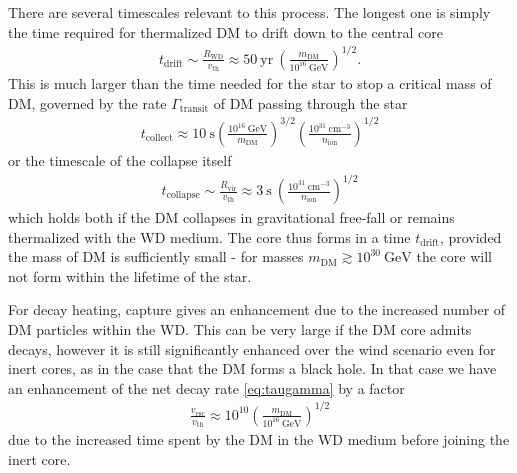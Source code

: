 \documentclass[preprintnumbers,amsmath,amssymb,prd, superscriptaddress,twocolumn]{revtex4}
\newcommand{\GeV}{\text{GeV}}
\newcommand{\cm}{\text{cm}}
\def\r{\right)}
\def\l{\left(}
\begin{document}
There are several timescales relevant to this process.
The longest one is simply the time required for thermalized DM to drift down to the central core
\begin{align}
\label{eq:tdrift}
  t_\text{drift} \sim \frac{R_\text{WD}}{v_\text{th}}
  \approx 50 ~\text{yr} ~ \l \frac{m_\text{DM}}{10^{16} ~\GeV} \r^{1/2}.
\end{align}
This is much larger than the time needed for the star to stop a critical mass of DM, governed by the rate $\Gamma_\text{transit}$ of DM passing through the star
\begin{align}
\label{eq:tcol}
  t_\text{collect}
  \approx 10 ~\text{s} \l \frac{10^{16} ~\GeV}{m_\text{DM}} \r^{3/2}
  \l \frac{10^{31} ~\cm^{-3}}{n_\text{ion}}\r^{1/2}
\end{align}
or the timescale of the collapse itself
\begin{align}
  t_\text{collapse} \sim \frac{R_\text{vir}}{v_\text{th}}
  \approx 3 ~\text{s} ~ \l \frac{10^{31} ~\cm^{-3}}{n_\text{ion}}\r^{1/2}
\end{align}
which holds both if the DM collapses in gravitational free-fall or remains thermalized with the WD medium.
The core thus forms in a time $t_\text{drift}$, provided the mass of DM is sufficiently small - for masses $m_\text{DM} \gtrsim 10^{30}~\GeV$ the core will not form within the lifetime of the star.

For decay heating, capture gives an enhancement due to the increased number of DM particles within the WD.
This can be very large if the DM core admits decays, however it is still significantly enhanced over the wind scenario even for inert cores, as in the case that the DM forms a black hole.
In that case we have an enhancement of the net decay rate \eqref{eq:taugamma} by a factor
\begin{align}
  \frac{v_\text{esc}}{v_\text{th}}
  \approx 10^{10} \l \frac{m_\text{DM}}{10^{16}~\GeV} \r^{1/2}
\end{align}
due to the increased time spent by the DM in the WD medium before joining the inert core.
\end{document}
